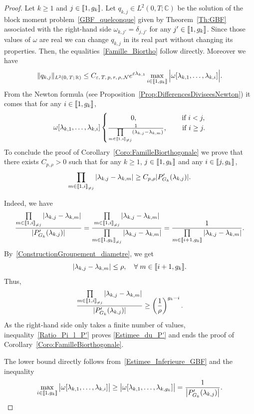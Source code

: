 \documentclass[AHL,Unicode,longabstracts]{cedram}
\newcommand{\llbracket}{\mathopen{[\mkern -2.7mu[}}
\newcommand{\rrbracket}{\mathclose{]\mkern -2.7mu]}}
\newcommand{\inter}[2]{\llbracket #1,#2 \rrbracket}
\newcommand{\interexclu}[3]{\llbracket #1,#2\rrbracket_{\neq #3}}
\newcommand{\n}{g}
\newcommand{\NN}{\mathcal{N}}
\newcommand{\R}{\mathbb{R}}
\newcommand{\C}{\mathbb{C}}
\let\oldforall\forall
\renewcommand*{\forall}{\mathrel{\oldforall}}
\begin{document}
\begin{proof}
Let $k \geq 1$ and $j \in \inter{1}{\n_k}$. Let $q_{k,j} \in L^2(0,T ; \C)$ be the solution of the block moment problem~\eqref{GBF_quelconque} given by Theorem~\ref{Th:GBF} associated with the right-hand side $\omega_{k, j'} = \delta_{j,j'}$ for any $j' \in \inter{1}{\n_k}$. Since those values of $\omega$ are real we can change $q_{k,j}$ in its real part without changing its properties. Then, the equalities~\eqref{Famille_Biortho} follow directly. Moreover we have
\[
\| q_{k,j} \|_{L^2(0,\,T ;\,\R)} \leq C_{\varepsilon,\,T,\,p,\,r,\,\rho,\,\NN} e^{\varepsilon \lambda_{k,1}} \max \limits_{i\in \inter{1}{\n_k}} \Big| \omega[\lambda_{k,1}, \dots, \lambda_{k,i}] \Big|.
\]
From the Newton formula (see Proposition~\ref{Prop:DifferencesDiviseesNewton}) it comes that for any $i \in \inter{1}{\n_k}$,
\begin{equation*}
\omega[\lambda_{k,1}, \dots, \lambda_{k,i}] \begin{cases}
\mkern60mu 0,& \quad\;\text{if }i<j,\\
\frac{1}{\prod\limits_{m \in \interexclu{1}{i}{j}} (\lambda_{k,j}-\lambda_{k,m})},&\quad \text{ if }i\geq j.
\end{cases}
\end{equation*}
To conclude the proof of Corollary~\ref{Coro:FamilleBiorthogonale} we prove that there exists $C_{p, \rho}>0$ such that for any $k\geq 1$, $j \in \inter{1}{\n_k}$ and any $i \in \inter{j}{\n_k}$,
\begin{equation}\label{Estimee_du_P'}
\prod_{m \in \interexclu{1}{i}{j}} | \lambda_{k,j} - \lambda_{k,m}| \geq C_{p,\rho} |P_{G_k}' (\lambda_{k,j}) |.
\end{equation}

Indeed, we have
\begin{equation*}
\frac{ \prod\limits_{m\in \interexclu{1}{i}{j} } | \lambda_{k,j} - \lambda_{k,m}|}{|P_{G_k}' (\lambda_{k,j}) |} = \frac{\prod\limits_{m\in \interexclu{1}{i}{j}} | \lambda_{k,j} - \lambda_{k,m}|}{\prod\limits_{m\in \interexclu{1}{\n_k}{j}} | \lambda_{k,j} - \lambda_{k,m}|} = \frac{1}{\prod\limits_{m\in \inter{i+1}{\n_k}} | \lambda_{k,j} - \lambda_{k,m}|}.
\end{equation*}
By~\eqref{ConstructionGroupement_diametre}, we get
\[
|\lambda_{k,j}-\lambda_{k,m}| \leq \rho, \quad \forall m \in \inter{i+1}{\n_k}.
\]
Thus,
\begin{equation}\label{Ratio_Pi_l_P'}
\frac{\prod\limits_{m\in \interexclu{1}{i}{j} } | \lambda_{k,j} - \lambda_{k,m}|}{|P_{G_k}' (\lambda_{k,j}) |}
\geq \left(\frac{1}{\rho} \right)^{\n_k-i}.
\end{equation}
As the right-hand side only takes a finite number of values, inequality~\eqref{Ratio_Pi_l_P'} proves \eqref{Estimee_du_P'} and ends the proof of Corollary~\ref{Coro:FamilleBiorthogonale}.

The lower bound directly follows from~\eqref{Estimee_Inferieure_GBF} and the inequality
\[
\max \limits_{i\in \inter{1}{\n_k}} \big| \omega[\lambda_{k,1}, \dots, \lambda_{k,i}] \big| \geq \big| \omega[\lambda_{k,1}, \dots, \lambda_{k,\n_k}] \big| = \frac{1}{\left| P_{G_k}'(\lambda_{k,j}) \right| }.\qedhere
\]
\end{proof}
\end{document}
